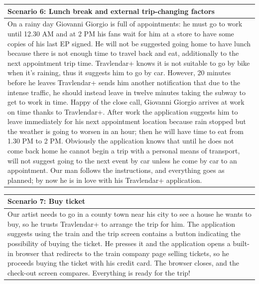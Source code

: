 %
\begin{center}
\def\arraystretch{1.5}
  \begin{tabular}{ | p{} | }
    \hline
    Scenario 6: Lunch break and external trip-changing factors \\ \hline
    On a rainy day Giovanni Giorgio is full of appointments: he must go to work until 12.30 AM and at 2 PM his fans wait for him at a store to have some copies of his last EP signed. He will not be suggested going home to have lunch because there is not enough time to travel back and eat, additionally to the next appointment trip time. Travlendar+ knows it is not suitable to go by bike when it’s raining, thus it suggests him to go by car. However, 20 minutes before he leaves Travlendar+ sends him another notification that due to the intense traffic, he should instead leave in twelve minutes taking the subway to get to work in time. Happy of the close call, Giovanni Giorgio arrives at work on time thanks to Travlendar+. After work the application suggests him to leave immediately for his next appointment location because rain stopped but the weather is going to worsen in an hour; then he will have time to eat from 1.30 PM to 2 PM. Obviously the application knows that until he does not come back home he cannot begin a trip with a personal means of transport, will not suggest going to the next event by car unless he come by car to an appointment. Our man follows the instructions, and everything goes as planned; by now he is in love with his Travlendar+ application.  \\ \hline
  \end{tabular}
\end{center}
%
\begin{center}
\def\arraystretch{1.5}
  \begin{tabular}{ | p{} | }
    \hline
    Scenario 7: Buy ticket \\ \hline
    Our artist needs to go in a county town near his city to see a house he wants to buy, so he trusts Travlendar+ to arrange the trip for him. The application suggests using the train and the trip screen contains a button indicating the possibility of buying the ticket. He presses it and the application opens a built-in browser that redirects to the train company page selling tickets, so he proceeds buying the ticket with his credit card. The browser closes, and the check-out screen compares. Everything is ready for the trip! \\ \hline
  \end{tabular}
\end{center}
\pagebreak
%
